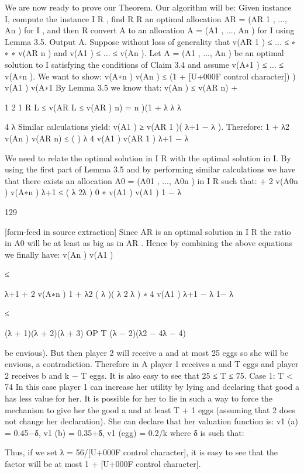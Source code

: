 \documentclass[10pt]{article}
\begin{document}
\begin{ReviewVerbatim}
We are now ready to prove our Theorem. Our algorithm
will be: Given instance I, compute the instance I R , find
R
R
an optimal allocation AR = (AR
1 , ..., An ) for I , and then
R
convert A to an allocation A = (A1 , ..., An ) for I using
Lemma 3.5. Output A.
Suppose without loss of generality that v(AR
1 ) ≤ ... ≤
∗
∗
∗
v(AR
n ) and v(A1 ) ≤ ... ≤ v(An ). Let A = (A1 , ..., An ) be an
optimal solution to I satisfying the conditions of Claim 3.4
and assume v(A∗1 ) ≤ ... ≤ v(A∗n ). We want to show:
v(A∗n )
v(An )
≤ (1 + [U+000F control character])
)
v(A1 )
v(A∗1
By Lemma 3.5 we know that:
v(An ) ≤ v(AR
n) +

1
2
1 R
L ≤ v(AR
L ≤ v(AR
)
n) =
n )(1 +
λ
λ
λ

4
λ
Similar calculations yield: v(A1 ) ≥ v(AR
1 )( λ+1 − λ ). Therefore:
1 + λ2
v(An )
v(AR
n)
≤
(
)
λ
4
v(A1 )
v(AR
1 ) λ+1 − λ

We need to relate the optimal solution in I R with the
optimal solution in I. By using the first part of Lemma 3.5
and by performing similar calculations we have that there
exists an allocation A0 = (A01 , ..., A0n ) in I R such that:
+ 2
v(A0n )
v(A∗n ) λ+1
≤
( λ 2λ )
0
∗
v(A1 )
v(A1 ) 1 − λ

129


[form-feed in source extraction]
Since AR is an optimal solution in I R the ratio in A0 will
be at least as big as in AR . Hence by combining the above
equations we finally have:
v(An )
v(A1 )

≤

λ+1
+ 2
v(A∗n ) 1 + λ2
( λ
)( λ 2 λ )
∗
4
v(A1 ) λ+1 − λ
1− λ

≤

(λ + 1)(λ + 2)(λ + 3)
OP T
(λ − 2)(λ2 − 4λ − 4)

be envious). But then player 2 will receive a and at most 25
eggs so she will be envious, a contradiction. Therefore in A
player 1 receives a and T eggs and player 2 receives b and
k − T eggs. It is also easy to see that 25 ≤ T ≤ 75.
Case 1: T < 74
In this case player 1 can increase her utility by lying and
declaring that good a has less value for her. It is possible for
her to lie in such a way to force the mechanism to give her
the good a and at least T + 1 eggs (assuming that 2 does not
change her declaration). She can declare that her valuation
function is: v1 (a) = 0.45−δ, v1 (b) = 0.35+δ, v1 (egg) = 0.2/k
where δ is such that:

Thus, if we set λ = 56/[U+000F control character], it is easy to see that the factor
will be at most 1 + [U+000F control character].
\end{ReviewVerbatim}
\end{document}
